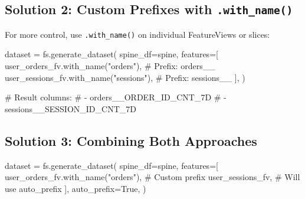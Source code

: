 \documentclass[
  letterpaper,
  DIV=11,
  numbers=noendperiod]{scrreprt}
\newenvironment{Shaded}{\begin{snugshade}}{\end{snugshade}}
\newcommand{\CommentTok}[1]{\textcolor[rgb]{0.37,0.37,0.37}{#1}}
\newcommand{\NormalTok}[1]{\textcolor[rgb]{0.00,0.23,0.31}{#1}}
\newcommand{\OperatorTok}[1]{\textcolor[rgb]{0.37,0.37,0.37}{#1}}
\newcommand{\StringTok}[1]{\textcolor[rgb]{0.13,0.47,0.30}{#1}}
\newcommand{\VariableTok}[1]{\textcolor[rgb]{0.07,0.07,0.07}{#1}}
\begin{document}
\hypertarget{solution-2-custom-prefixes-with-.with_name}{%
\subsection{\texorpdfstring{Solution 2: Custom Prefixes with
\texttt{.with\_name()}}{Solution 2: Custom Prefixes with .with\_name()}}\label{solution-2-custom-prefixes-with-.with_name}}

For more control, use \texttt{.with\_name()} on individual FeatureViews
or slices:

\begin{Shaded}
\begin{Highlighting}[]
\NormalTok{dataset }\OperatorTok{=}\NormalTok{ fs.generate\_dataset(}
\NormalTok{    spine\_df}\OperatorTok{=}\NormalTok{spine,}
\NormalTok{    features}\OperatorTok{=}\NormalTok{[}
\NormalTok{        user\_orders\_fv.with\_name(}\StringTok{"orders"}\NormalTok{),      }\CommentTok{\# Prefix: orders\_\_}
\NormalTok{        user\_sessions\_fv.with\_name(}\StringTok{"sessions"}\NormalTok{),  }\CommentTok{\# Prefix: sessions\_\_}
\NormalTok{    ],}
\NormalTok{)}

\CommentTok{\# Result columns:}
\CommentTok{\# {-} orders\_\_ORDER\_ID\_CNT\_7D}
\CommentTok{\# {-} sessions\_\_SESSION\_ID\_CNT\_7D}
\end{Highlighting}
\end{Shaded}

\hypertarget{solution-3-combining-both-approaches}{%
\subsection{Solution 3: Combining Both
Approaches}\label{solution-3-combining-both-approaches}}

\begin{Shaded}
\begin{Highlighting}[]
\NormalTok{dataset }\OperatorTok{=}\NormalTok{ fs.generate\_dataset(}
\NormalTok{    spine\_df}\OperatorTok{=}\NormalTok{spine,}
\NormalTok{    features}\OperatorTok{=}\NormalTok{[}
\NormalTok{        user\_orders\_fv.with\_name(}\StringTok{"orders"}\NormalTok{),  }\CommentTok{\# Custom prefix}
\NormalTok{        user\_sessions\_fv,                     }\CommentTok{\# Will use auto\_prefix}
\NormalTok{    ],}
\NormalTok{    auto\_prefix}\OperatorTok{=}\VariableTok{True}\NormalTok{,}
\NormalTok{)}
\end{Highlighting}
\end{Shaded}
\end{document}
